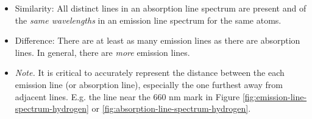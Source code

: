 \documentclass[oneside]{book}
\begin{document}
\begin{itemize}
\begin{table}[H]
    \end{table}
    \item Similarity: All distinct lines in an absorption line spectrum are present and of the \emph{same wavelengths} in an emission line spectrum for the same atoms.
    \item Difference: There are at least as many emission lines as there are absorption lines. In general, there are \emph{more} emission lines. 
    \item \emph{Note.} It is critical to accurately represent the distance between the each emission line (or absorption line), especially the one furthest away from adjacent lines. E.g. the line near the 660 nm mark in Figure \ref{fig:emission-line-spectrum-hydrogen} or \ref{fig:absorption-line-spectrum-hydrogen}. 
\end{itemize}
\end{document}
